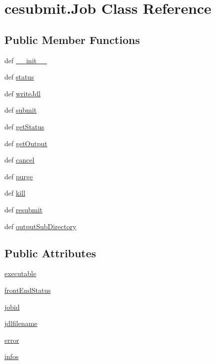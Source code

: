 \section{cesubmit.\-Job Class Reference}
\label{classcesubmit_1_1Job}
\subsection*{Public Member Functions}
\begin{DoxyCompactItemize}
\item 
def \hyperlink{classcesubmit_1_1Job_afe45b2b3694dc2eb55d03b79e7eedccf}{\-\_\-\-\_\-init\-\_\-\-\_\-}
\item 
def \hyperlink{classcesubmit_1_1Job_ae897274562a27a93356fc2f327802fad}{status}
\item 
def \hyperlink{classcesubmit_1_1Job_a8da64d8d54df87c2d0ca9a3a04c879b4}{write\-Jdl}
\item 
def \hyperlink{classcesubmit_1_1Job_a3d7e03c1f64ecff06186f2fc44461aa7}{submit}
\item 
def \hyperlink{classcesubmit_1_1Job_a833abc5b92b6ace4ba4127fe574884b5}{get\-Status}
\item 
def \hyperlink{classcesubmit_1_1Job_ab50d7ec391c2c1432eae9fb52f0ceb6b}{get\-Output}
\item 
def \hyperlink{classcesubmit_1_1Job_a5ad709635643e5b85c304d3e9fc2d99d}{cancel}
\item 
def \hyperlink{classcesubmit_1_1Job_a7f3adbcda93e3a28cdd8ab09bbb797f4}{purge}
\item 
def \hyperlink{classcesubmit_1_1Job_ac5951dc82702ecf06c8a054911352433}{kill}
\item 
def \hyperlink{classcesubmit_1_1Job_a3e4d9a434cef0282ba6446d34405453e}{resubmit}
\item 
def \hyperlink{classcesubmit_1_1Job_ae6a4ad2c2a60ada9af756063edc20262}{output\-Sub\-Directory}
\end{DoxyCompactItemize}
\subsection*{Public Attributes}
\begin{DoxyCompactItemize}
\item 
\hyperlink{classcesubmit_1_1Job_a7d04d17b3d5b04fcea30691dcffbe796}{executable}
\item 
\hyperlink{classcesubmit_1_1Job_ab874e04d52ac16aab1a8e14b5a679bae}{front\-End\-Status}
\item 
\hyperlink{classcesubmit_1_1Job_a65d1f01433276553979481396c9faadf}{jobid}
\item 
\hyperlink{classcesubmit_1_1Job_a2b667da47389ffd8d97902da2080f3b3}{jdlfilename}
\item 
\hyperlink{classcesubmit_1_1Job_a8631c75a3698ff940214b4a43f9d2ae2}{error}
\item 
\hyperlink{classcesubmit_1_1Job_a040f59b13e8ffdbd9ef40aa8fc14c327}{infos}
\end{DoxyCompactItemize}



